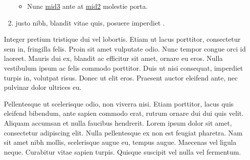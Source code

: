 \documentclass[letterpaper,10pt,english]{sphinxmanual}
\begin{document}
\begin{enumerate}
\begin{itemize}
\item {} 
\sphinxAtStartPar
Nunc \hyperlink{\detokenize{test-mid3-id1}}{\hypertarget{\detokenize{test-mid3-id0}}{mid3}} ante at \hyperlink{\detokenize{test-mid2-id0}}{\hypertarget{\detokenize{test-mid2-id1}}{mid2}} molestie porta.

\end{itemize}

\item {} 
\sphinxAtStartPar
\hyperlink{\detokenize{id2}}{} justo nibh, blandit vitae \hyperlink{\detokenize{bid3}}{\hypertarget{\detokenize{bid3-ref17}}{}} quis, posuere
imperdiet \hyperlink{\detokenize{bid4}}{\hypertarget{\detokenize{bid4-ref18}}{}}.

\end{enumerate}

\sphinxAtStartPar
Integer pretium tristique dui vel lobortis. Etiam ut lacus porttitor, consectetur sem in, fringilla
felis. Proin sit amet vulputate odio. Nunc tempor congue orci id laoreet. Mauris dui ex, blandit ac
efficitur sit amet, ornare eu eros. Nulla vestibulum ipsum ac felis commodo porttitor. Duis ut nisi
consequat, imperdiet turpis in, volutpat risus. Donec ut elit eros. Praesent auctor eleifend ante,
nec pulvinar dolor ultrices eu.

\sphinxAtStartPar
Pellentesque ut scelerisque odio, non viverra nisi. Etiam porttitor, lacus quis eleifend bibendum,
ante sapien commodo erat, rutrum ornare dui dui quis velit. Aliquam accumsan et nulla faucibus
hendrerit. Lorem ipsum dolor sit amet, consectetur adipiscing elit. Nulla pellentesque ex non est
feugiat pharetra. Nam sit amet nibh mollis, scelerisque augue eu, tempus augue. Maecenas vel ligula
neque. Curabitur vitae sapien turpis. Quisque suscipit vel nulla vel fermentum.
\end{document}
